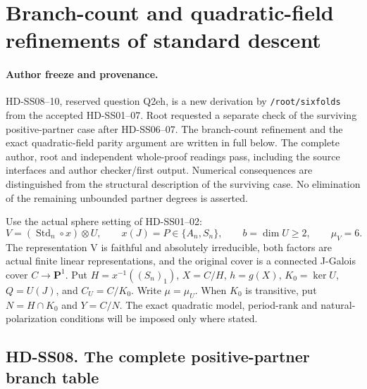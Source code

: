 \section{Branch-count and quadratic-field refinements of standard descent}
\label{sec:standard-partner-hurwitz-refinement}

\paragraph{Author freeze and provenance.}
HD-SS08--10, reserved question Q2eh, is a new derivation by
\texttt{/root/sixfolds} from the accepted HD-SS01--07.
Root requested a separate check of the surviving positive-partner
case after HD-SS06--07. The branch-count refinement and the exact
quadratic-field parity argument are written in full below.
The complete author, root and independent whole-proof readings pass,
including the source interfaces and author checker/first output.
Numerical consequences are distinguished
from the structural description of the surviving case. No elimination
of the remaining unbounded partner degrees is asserted.

Use the actual sphere setting of HD-SS01--02:
\[
 V=(\operatorname{Std}_n\circ x)\otimes U,\qquad
 x(J)=P\in\{A_n,S_n\},\qquad b=\dim U\ge2,
 \qquad \mu_V=6.                                      \tag{SH.1}
\]
The representation V is faithful and absolutely irreducible, both
factors are actual finite linear representations, and the original
cover is a connected J-Galois cover \(C\to\mathbf P^1\).
Put \(H=x^{-1}((S_n)_1)\), \(X=C/H\), \(h=g(X)\),
\(K_0=\ker U\), \(Q=U(J)\), and \(C_U=C/K_0\).
Write \(\mu=\mu_U\). When \(K_0\) is transitive, put
\(N=H\cap K_0\) and \(Y=C/N\).
The exact quadratic model, period-rank and natural-polarization
conditions will be imposed only where stated.

\subsection*{HD-SS08. The complete positive-partner branch table}

